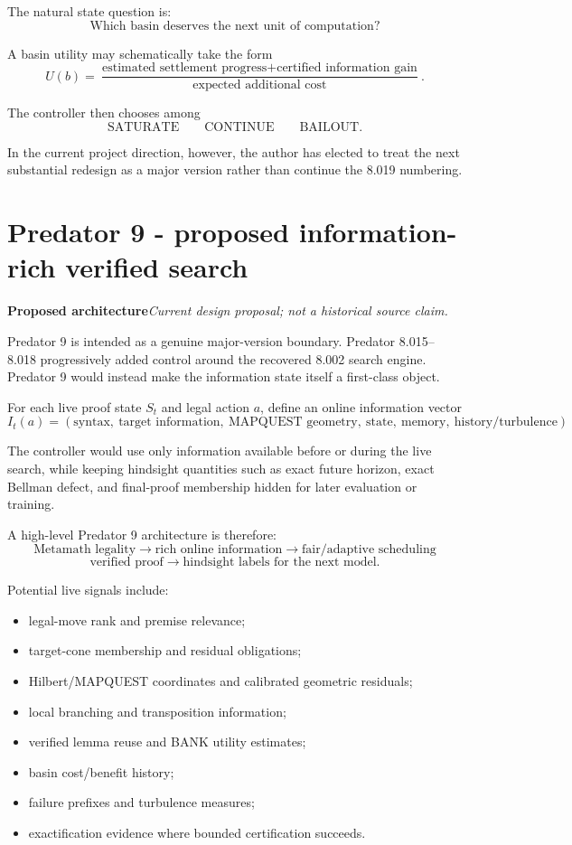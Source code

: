 \documentclass[11pt]{article}
\newcommand{\proposed}{\textbf{Proposed architecture}}
\begin{document}
The natural state question is:
\[
\text{Which basin deserves the next unit of computation?}
\]

A basin utility may schematically take the form
\[
U(b)=\frac{\text{estimated settlement progress}+\text{certified information gain}}{\text{expected additional cost}}.
\]

The controller then chooses among
\[
\boxed{\text{SATURATE}}
\qquad
\boxed{\text{CONTINUE}}
\qquad
\boxed{\text{BAILOUT}}.
\]

In the current project direction, however, the author has elected to treat the next substantial redesign as a major version rather than continue the 8.019 numbering.

\section{Predator 9 - proposed information-rich verified search}

\begin{statusbox}\proposed\quad\textit{Current design proposal; not a historical source claim.}\end{statusbox}

Predator 9 is intended as a genuine major-version boundary. Predator 8.015--8.018 progressively added control around the recovered 8.002 search engine. Predator 9 would instead make the information state itself a first-class object.

For each live proof state $S_t$ and legal action $a$, define an online information vector
\[
I_t(a)=
(\text{syntax},\ \text{target information},\ \text{MAPQUEST geometry},\ \text{state},\ \text{memory},\ \text{history/turbulence}).
\]

The controller would use only information available before or during the live search, while keeping hindsight quantities such as exact future horizon, exact Bellman defect, and final-proof membership hidden for later evaluation or training.

A high-level Predator 9 architecture is therefore:
\[
\boxed{\text{Metamath legality}}
\to
\boxed{\text{rich online information}}
\to
\boxed{\text{fair/adaptive scheduling}}
\]
\[
\boxed{\text{verified proof}}
\to
\boxed{\text{hindsight labels for the next model}}.
\]

Potential live signals include:
\begin{itemize}
\item legal-move rank and premise relevance;
\item target-cone membership and residual obligations;
\item Hilbert/MAPQUEST coordinates and calibrated geometric residuals;
\item local branching and transposition information;
\item verified lemma reuse and BANK utility estimates;
\item basin cost/benefit history;
\item failure prefixes and turbulence measures;
\item exactification evidence where bounded certification succeeds.
\end{itemize}
\end{document}
